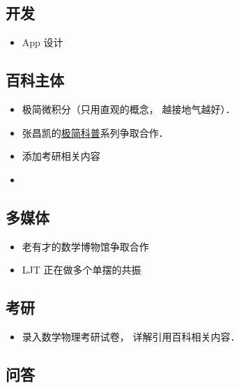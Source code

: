 
\subsection{开发}
\begin{itemize}
\item App 设计
\end{itemize}

\subsection{百科主体}
\begin{itemize}
\item 极简微积分（只用直观的概念， 越接地气越好）．
\item 张昌凯的\href{https://www.zhihu.com/column/c_1328480072068386816}{极简科普}系列争取合作．
\item 添加考研相关内容
\item 
\end{itemize}

\subsection{多媒体}
\begin{itemize}
\item 老有才的数学博物馆争取合作
\item LJT 正在做多个单摆的共振
\end{itemize}

\subsection{考研}
\begin{itemize}
\item 录入数学物理考研试卷， 详解引用百科相关内容．
\end{itemize}


\subsection{问答}

